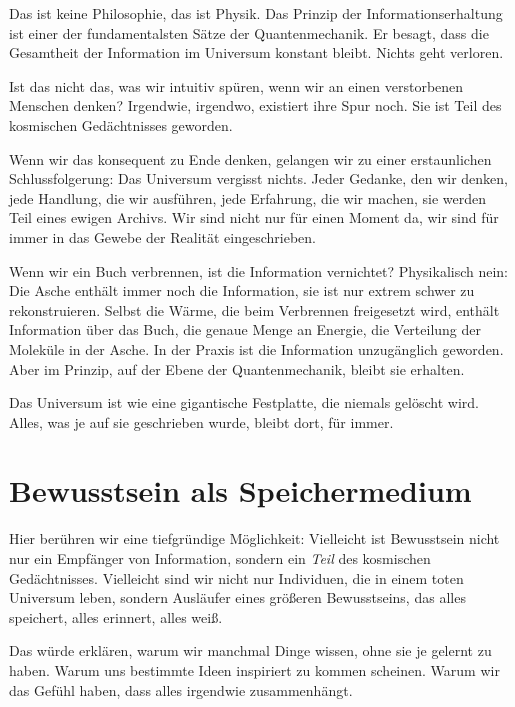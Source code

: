 Das ist keine Philosophie, das ist Physik. Das Prinzip der Informationserhaltung ist einer der fundamentalsten Sätze der Quantenmechanik. Er besagt, dass die Gesamtheit der Information im Universum konstant bleibt. Nichts geht verloren.

Ist das nicht das, was wir intuitiv spüren, wenn wir an einen verstorbenen Menschen denken? Irgendwie, irgendwo, existiert ihre Spur noch. Sie ist Teil des kosmischen Gedächtnisses geworden.

Wenn wir das konsequent zu Ende denken, gelangen wir zu einer erstaunlichen Schlussfolgerung: Das Universum vergisst nichts. Jeder Gedanke, den wir denken, jede Handlung, die wir ausführen, jede Erfahrung, die wir machen, sie werden Teil eines ewigen Archivs. Wir sind nicht nur für einen Moment da, wir sind für immer in das Gewebe der Realität eingeschrieben.

\begin{bsp}
	Wenn wir ein Buch verbrennen, ist die Information vernichtet? Physikalisch nein: Die Asche enthält immer noch die Information, sie ist nur extrem schwer zu rekonstruieren. Selbst die Wärme, die beim Verbrennen freigesetzt wird, enthält Information über das Buch, die genaue Menge an Energie, die Verteilung der Moleküle in der Asche. In der Praxis ist die Information unzugänglich geworden. Aber im Prinzip, auf der Ebene der Quantenmechanik, bleibt sie erhalten.
\end{bsp}

Das Universum ist wie eine gigantische Festplatte, die niemals gelöscht wird. Alles, was je auf sie geschrieben wurde, bleibt dort, für immer.

\section{Bewusstsein als Speichermedium}

Hier berühren wir eine tiefgründige Möglichkeit: Vielleicht ist Bewusstsein nicht nur ein Empfänger von Information, sondern ein \emph{Teil} des kosmischen Gedächtnisses. Vielleicht sind wir nicht nur Individuen, die in einem toten Universum leben, sondern Ausläufer eines größeren Bewusstseins, das alles speichert, alles erinnert, alles weiß.

Das würde erklären, warum wir manchmal Dinge \glqq wissen\grqq{}, ohne sie je gelernt zu haben. Warum uns bestimmte Ideen \glqq inspiriert\grqq{} zu kommen scheinen. Warum wir das Gefühl haben, dass alles irgendwie zusammenhängt.


